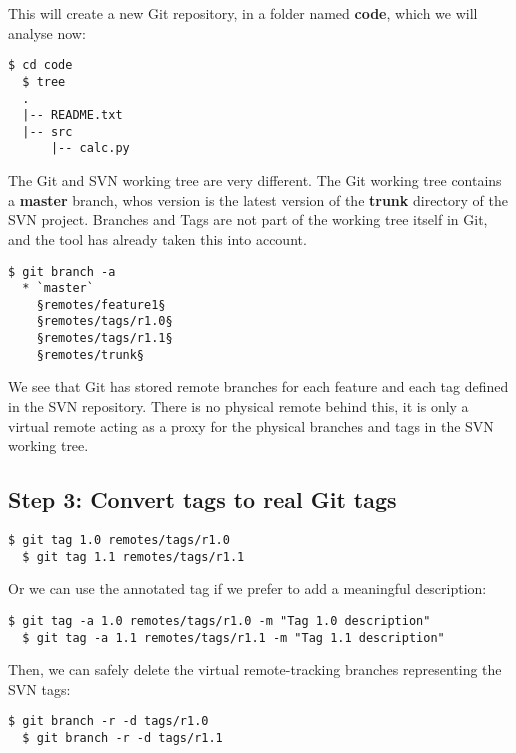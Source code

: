\documentclass{../common/tufte-latex/tufte-handout}
\begin{document}
This will create a new Git repository, in a folder named \textbf{code}, which we will analyse now:

\begin{lstlisting}[style=BashInputStyle]
  $ cd code
  $ tree
  .
  |-- README.txt
  |-- src
      |-- calc.py
\end{lstlisting}

The Git and SVN working tree are very different.
The Git working tree contains a \textbf{master} branch, whos version is the latest version of the \textbf{trunk} directory of the SVN project.
Branches and Tags are not part of the working tree itself in Git, and the tool has already taken this into account.

\begin{lstlisting}[style=BashInputStyle]
  $ git branch -a
  * `master`
    §remotes/feature1§
    §remotes/tags/r1.0§
    §remotes/tags/r1.1§
    §remotes/trunk§
\end{lstlisting}

We see that Git has stored remote branches for each feature and each tag defined in the SVN repository.
There is no physical remote behind this, it is only a virtual remote acting as a proxy for the physical branches and tags in the SVN working tree.

\subsection{Step 3: Convert tags to real Git tags}

\begin{lstlisting}[style=BashInputStyle]
  $ git tag 1.0 remotes/tags/r1.0
  $ git tag 1.1 remotes/tags/r1.1
\end{lstlisting}

Or we can use the annotated tag if we prefer to add a meaningful description:

\begin{lstlisting}[style=BashInputStyle]
  $ git tag -a 1.0 remotes/tags/r1.0 -m "Tag 1.0 description"
  $ git tag -a 1.1 remotes/tags/r1.1 -m "Tag 1.1 description"
\end{lstlisting}

Then, we can safely delete the virtual remote-tracking branches representing the SVN tags:

\begin{lstlisting}[style=BashInputStyle]
  $ git branch -r -d tags/r1.0
  $ git branch -r -d tags/r1.1
\end{lstlisting}
\end{document}
